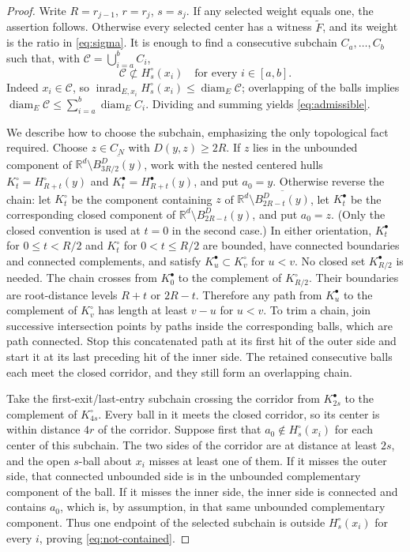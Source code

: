 \documentclass[11pt,reqno]{amsart}
\theoremstyle{plain}
\theoremstyle{definition}
\theoremstyle{remark}
\newcommand{\R}{\mathbb R}
\newcommand{\diam}{\operatorname{diam}}
\newcommand{\inrad}{\operatorname{inrad}}
\newcommand{\1}{\mathbf{1}}
\newcommand{\bd}{B^{D}}
\begin{document}
\begin{proof}
Write $R=r_{j-1}$, $r=r_j$, $s=s_j$. If any selected weight equals one, the assertion follows. Otherwise every selected center has a witness $\widetilde F$, and its weight is the ratio in \eqref{eq:sigma}. It is enough to find a consecutive subchain $C_a,\ldots,C_b$ such that, with $\mathcal C=\bigcup_{i=a}^bC_i$,
\begin{equation}\label{eq:not-contained}
\mathcal C\not\subset H_s^\circ(x_i)
\quad\text{for every }i\in[a,b].
\end{equation}
Indeed $x_i\in\mathcal C$, so $\inrad_{E,x_i}H_s^\circ(x_i)\le\diam_E\mathcal C$; overlapping of the balls implies $\diam_E\mathcal C\le\sum_{i=a}^b\diam_E C_i$. Dividing and summing yields \eqref{eq:admissible}.

We describe how to choose the subchain, emphasizing the only topological fact required. Choose $z\in C_N$ with $D(y,z)\ge2R$. If $z$ lies in the unbounded component of $\R^d\setminus\overline{\bd_{3R/2}(y)}$, work with the nested centered hulls $K_t^\circ=H_{R+t}^\circ(y)$ and $K_t^\bullet=H_{R+t}^\bullet(y)$, and put $a_0=y$. Otherwise reverse the chain: let $K_t^\circ$ be the component containing $z$ of $\R^d\setminus\overline{\bd_{2R-t}(y)}$, let $K_t^\bullet$ be the corresponding closed component of $\R^d\setminus\bd_{2R-t}(y)$, and put $a_0=z$. (Only the closed convention is used at $t=0$ in the second case.) In either orientation, $K_t^\bullet$ for $0\le t<R/2$ and $K_t^\circ$ for $0<t\le R/2$ are bounded, have connected boundaries and connected complements, and satisfy $K_u^\bullet\subset K_v^\circ$ for $u<v$. No closed set $K_{R/2}^\bullet$ is needed. The chain crosses from $K_0^\bullet$ to the complement of $K_{R/2}^\circ$. Their boundaries are root-distance levels $R+t$ or $2R-t$. Therefore any path from $K_u^\bullet$ to the complement of $K_v^\circ$ has length at least $v-u$ for $u<v$. To trim a chain, join successive intersection points by paths inside the corresponding balls, which are path connected. Stop this concatenated path at its first hit of the outer side and start it at its last preceding hit of the inner side. The retained consecutive balls each meet the closed corridor, and they still form an overlapping chain.

Take the first-exit/last-entry subchain crossing the corridor from $K_{2s}^\bullet$ to the complement of $K_{4s}^\circ$. Every ball in it meets the closed corridor, so its center is within distance $4r$ of the corridor. Suppose first that $a_0\notin H_s^\circ(x_i)$ for each center of this subchain. The two sides of the corridor are at distance at least $2s$, and the open $s$-ball about $x_i$ misses at least one of them. If it misses the outer side, that connected unbounded side is in the unbounded complementary component of the ball. If it misses the inner side, the inner side is connected and contains $a_0$, which is, by assumption, in that same unbounded complementary component. Thus one endpoint of the selected subchain is outside $H_s^\circ(x_i)$ for every $i$, proving \eqref{eq:not-contained}.


\end{proof}
\end{document}
